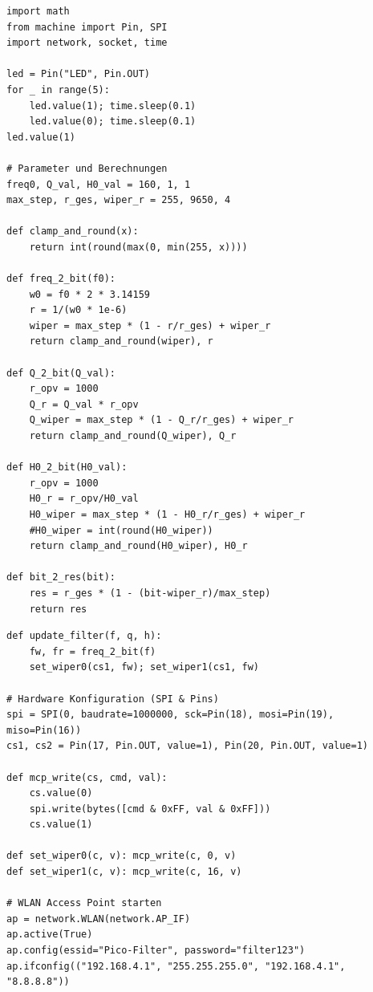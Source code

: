 \documentclass[a4paper,11pt]{book}
\begin{document}

\begin{lstlisting}[caption={Basis-Code Teil 1: Setup und Logik}]
import math
from machine import Pin, SPI
import network, socket, time

led = Pin("LED", Pin.OUT)
for _ in range(5):
    led.value(1); time.sleep(0.1)
    led.value(0); time.sleep(0.1)
led.value(1)

# Parameter und Berechnungen
freq0, Q_val, H0_val = 160, 1, 1
max_step, r_ges, wiper_r = 255, 9650, 4

def clamp_and_round(x):
    return int(round(max(0, min(255, x))))

def freq_2_bit(f0):
    w0 = f0 * 2 * 3.14159
    r = 1/(w0 * 1e-6)
    wiper = max_step * (1 - r/r_ges) + wiper_r
    return clamp_and_round(wiper), r

def Q_2_bit(Q_val):
    r_opv = 1000
    Q_r = Q_val * r_opv
    Q_wiper = max_step * (1 - Q_r/r_ges) + wiper_r
    return clamp_and_round(Q_wiper), Q_r

def H0_2_bit(H0_val):
    r_opv = 1000
    H0_r = r_opv/H0_val
    H0_wiper = max_step * (1 - H0_r/r_ges) + wiper_r
    #H0_wiper = int(round(H0_wiper))
    return clamp_and_round(H0_wiper), H0_r

def bit_2_res(bit):
    res = r_ges * (1 - (bit-wiper_r)/max_step) 
    return res

\end{lstlisting}

\begin{lstlisting}[caption={Basis-Code Teil 2: Hardware-Schnittstellen}]
def update_filter(f, q, h):
    fw, fr = freq_2_bit(f)
    set_wiper0(cs1, fw); set_wiper1(cs1, fw)

# Hardware Konfiguration (SPI & Pins)
spi = SPI(0, baudrate=1000000, sck=Pin(18), mosi=Pin(19), miso=Pin(16))
cs1, cs2 = Pin(17, Pin.OUT, value=1), Pin(20, Pin.OUT, value=1)

def mcp_write(cs, cmd, val):
    cs.value(0)
    spi.write(bytes([cmd & 0xFF, val & 0xFF]))
    cs.value(1)

def set_wiper0(c, v): mcp_write(c, 0, v)
def set_wiper1(c, v): mcp_write(c, 16, v)

# WLAN Access Point starten
ap = network.WLAN(network.AP_IF)
ap.active(True)
ap.config(essid="Pico-Filter", password="filter123")
ap.ifconfig(("192.168.4.1", "255.255.255.0", "192.168.4.1", "8.8.8.8"))
\end{lstlisting}
\end{document}
